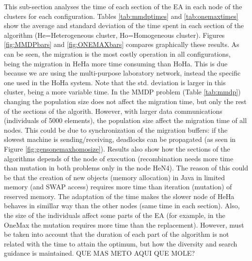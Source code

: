 This sub-section analyses the time of each section of the EA in each node of the clusters for each configuration. Tables \ref{tab:mmdptimes} and \ref{tab:onemaxtimes} show the average and standard deviation of the time spent in each section of the algorithm (He=Heterogeneous cluster, Ho=Homogeneous cluster). Figures \ref{fig:MMDPbars} and \ref{fig:ONEMAXbars} compares graphically these results. As can be seen, the migration is the most costly operation in all configurations, being the migration in HeHa more time consuming than HoHa. This is due because we are using the multi-purpose laboratory network, instead the specific one used in the HoHa system. Note that the std. deviation is larger in this cluster, being a more variable time. In the MMDP problem (Table \ref{tab:mmdp}) changing the population size does not affect the migration time, but only the rest of the sections of the algorith. However, with larger data communications (individuals of 5000 elements), the population size affect the migration time of all nodes. This could be due to synchronization of the migration buffers: if the slowest machine is sending/receiving, deadlocks can be propagated (as seen in Figure \ref{fig:gensonemaxhomosize}). Results also show how the sections of the algorithms depends of the node of execution (recombination needs more time than mutation in both problems only in the node HeN4). The reason of this could be that the creation of new objects (memory allocation) in Java in limited memory (and SWAP access) requires more time than iteration (mutation) of reserved memory. The adaptation of the time makes the slower node of HeHa behaves in simillar way than the other nodes (same time in each section). Also, the size of the individuals affect some parts of the EA (for example, in the OneMax the mutation requires more time than the replacement). However, must be taken into account that the duration of each part of the algorithm is not related with the time to attain the optimum, but how the diversity and search guidance is maintained. QUE MAS METO AQUI QUE MOLE?

\begin{figure*}
\centering
{}
\caption{Average time in each section of the algorithm for the MMDP problem.}
\label{fig:MMDPbars}
\end{figure*}

\begin{figure*}
\centering
{}
\caption{Average time in each section of the algorithm for the ONEMAX problem.}
\label{fig:ONEMAXbars}
\end{figure*}

